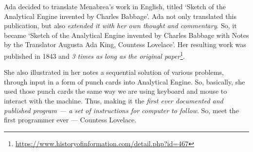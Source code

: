 \documentclass{report}
\begin{document}
            Ada decided to translate Menabrea's work in English, titled `Sketch of the Analytical Engine invented by Charles Babbage'. Ada not only translated this publication, but
            also \emph{extended it with her own thought and commentary}. So, it became `Sketch of the Analytical Engine invented by Charles Babbage with Notes by the Translator Augusta Ada King, Countess Lovelace'.
            Her resulting work was published in 1843 and \emph{3 times as long as the original paper}\footnote{\href{https://www.historyofinformation.com/detail.php?id=467}{https://www.historyofinformation.com/detail.php?id=467}}. \par

  
            She also illustrated in her notes a sequential solution of various problems, through input in a form of punch cards into Analytical Engine. So, basically, she used 
            those punch cards the same way we are using keyboard and mouse to interact with the machine. Thus, making it the \emph{first ever documented and published program --- a 
            set of instructions for computer to follow}. So, meet the first programmer ever --- Countess Lovelace. \par

\end{document}

